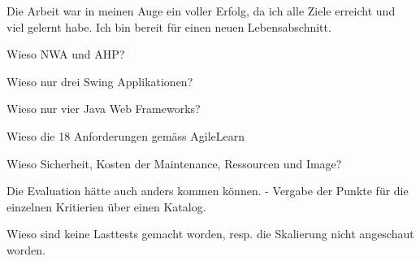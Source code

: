   Die Arbeit war in meinen Auge ein voller Erfolg, da ich alle Ziele erreicht
  und viel gelernt habe. Ich bin bereit für einen neuen Lebensabschnitt.

  Wieso NWA und AHP?

  Wieso nur drei Swing Applikationen?
  
  Wieso nur vier Java Web Frameworks?
  
  Wieso die 18 Anforderungen gemäss AgileLearn
  
  Wieso Sicherheit, Kosten der Maintenance, Ressourcen und Image?
  
  Die Evaluation hätte auch anders kommen können.
    - Vergabe der Punkte für die einzelnen Kritierien über einen Katalog.
  
  Wieso sind keine Lasttests gemacht worden, resp. die Skalierung nicht
  angeschaut worden.
